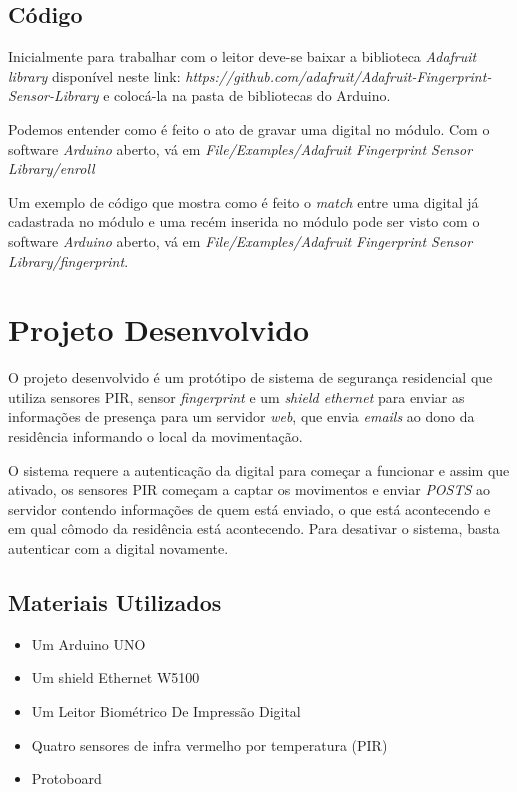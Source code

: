 \documentclass[13pt,a4]{article}
\begin{document}
\subsection{Código} 
	 Inicialmente para trabalhar com o leitor deve-se baixar a biblioteca \textit{Adafruit library} disponível neste link: \textit{https://github.com/adafruit/Adafruit-Fingerprint-Sensor-Library} e colocá-la na pasta de bibliotecas do Arduino. 
	 	
	 Podemos entender como é feito o ato de gravar uma digital no módulo. Com o software \textit{Arduino} aberto, vá em \textit{File/Examples/Adafruit Fingerprint Sensor Library/enroll} 
	 
	 Um exemplo de código que mostra como é feito o \textit{match} entre uma digital já cadastrada no módulo e uma recém inserida no módulo pode ser visto com o software \textit{Arduino} aberto, vá em \textit{File/Examples/Adafruit Fingerprint Sensor Library/fingerprint}.
 
\section{Projeto Desenvolvido}

O projeto desenvolvido é um protótipo de sistema de segurança residencial que utiliza sensores PIR, sensor \textit{fingerprint} e um \textit{shield ethernet} para enviar as informações de presença para um servidor \textit{web}, que envia \textit{emails} ao dono da residência informando o local da movimentação.

O sistema requere a autenticação da digital para começar a funcionar e assim que ativado, os sensores PIR começam a captar os movimentos e enviar \textit{POSTS} ao servidor contendo informações de quem está enviado, o que está acontecendo e em qual cômodo da residência está acontecendo. Para desativar o sistema, basta autenticar com a digital novamente.
 
\subsection{Materiais Utilizados}
	\begin{itemize}
		\item Um Arduino UNO 
		\item Um shield Ethernet W5100
		\item Um  Leitor Biométrico De Impressão Digital
		\item Quatro sensores de infra vermelho por temperatura (PIR)
		\item Protoboard
	\end{itemize}
 
\end{document}
